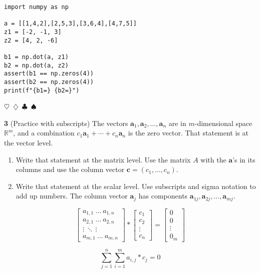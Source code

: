 \documentclass{article}
\newcommand{\sep}{\begin{center}$\heartsuit$~$\diamondsuit$~$\clubsuit$~$\spadesuit$\end{center}}
\newcommand{\vect}[1]{\ensuremath{\boldsymbol{#1}}}
\begin{document}
\begin{verbatim}
import numpy as np

a = [[1,4,2],[2,5,3],[3,6,4],[4,7,5]]
z1 = [-2, -1, 3]
z2 = [4, 2, -6]

b1 = np.dot(a, z1)
b2 = np.dot(a, z2)
assert(b1 == np.zeros(4))
assert(b2 == np.zeros(4))
print(f"{b1=} {b2=}")
\end{verbatim}

\sep

\noindent\textbf{3} (Practice with subscripts) The vectors $\vect{a}_1, \vect{a}_2, \ldots , \vect{a}_n$ are in $m$-dimensional space $\mathbb{R}^m$, and a combination $c_1\vect{a}_1 + \cdots + c_n\vect{a}_n$ is the zero vector. That statement is at the vector level. 
\begin{enumerate}
\item Write that statement at the matrix level. Use the matrix $A$ with the $\vect{a}$'s in its columns and use the column vector $\vect{c} = (c_1, \ldots, c_n)$.
\item Write that statement at the scalar level. Use subscripts and sigma notation to add up numbers. The column vector $\vect{a}_j$ has components $\vect{a}_{1j}, \vect{a}_{2j}, \ldots, \vect{a}_{mj}$.
\end{enumerate}

\begin{displaymath}
  \begin{bmatrix}
    a_{1,1} ~ \ldots ~ a_{1,n} \\
    a_{2,1} ~ \ldots ~ a_{2,n} \\
    \vdots ~ \ddots ~ \vdots \\
    a_{m,1} ~ \ldots ~ a_{m,n}
  \end{bmatrix}
  * \begin{bmatrix} c_1 \\ c_2 \\ \vdots \\ c_n \end{bmatrix}
  = \begin{bmatrix} 0 \\ 0 \\ \vdots \\ 0_m \end{bmatrix}
\end{displaymath}

\begin{displaymath}
\sum_{j=1}^{n} \sum_{i=1}^{m} a_{i,j} * c_j = 0
\end{displaymath}
\end{document}
